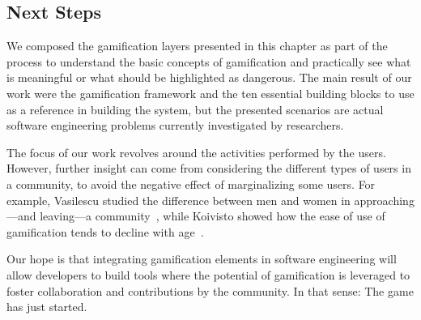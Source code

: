 \subsection{Next Steps}

We composed the gamification layers presented in this chapter as part of the process to understand the basic concepts of gamification and practically see what is meaningful or what should be highlighted as dangerous.
The main result of our work were the gamification framework and the ten essential building blocks to use as a reference in building the system, but the presented scenarios are actual software engineering problems currently investigated by researchers.

The focus of our work revolves around the activities performed by the users.
However, further insight can come from considering the different types of users in a community, to avoid the negative effect of marginalizing some users.
For example, Vasilescu \etal studied the difference between men and women in approaching---and leaving---a community~\cite{vasi2012}, while Koivisto \etal showed how the ease of use of gamification tends to decline with age~\cite{koiv2014}.


Our hope is that integrating gamification elements in software engineering will allow developers to build tools where the potential of gamification is leveraged to foster collaboration and contributions by the community.
In that sense: The game has just started.
